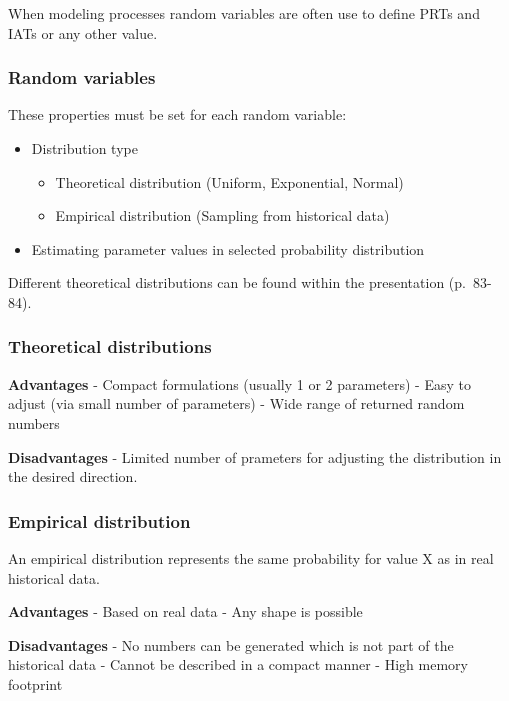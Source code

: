 When modeling processes random variables are often use to define PRTs
and IATs or any other value.

\hypertarget{random-variables}{%
\subsubsection{Random variables}\label{random-variables}}

These properties must be set for each random variable:

\begin{itemize}
\tightlist
\item
  Distribution type

  \begin{itemize}
  \tightlist
  \item
    Theoretical distribution (Uniform, Exponential, Normal)
  \item
    Empirical distribution (Sampling from historical data)
  \end{itemize}
\item
  Estimating parameter values in selected probability distribution
\end{itemize}

Different theoretical distributions can be found within the presentation
(p.~83-84).

\hypertarget{theoretical-distributions}{%
\subsubsection{Theoretical
distributions}\label{theoretical-distributions}}

\textbf{Advantages} - Compact formulations (usually 1 or 2 parameters) -
Easy to adjust (via small number of parameters) - Wide range of returned
random numbers

\textbf{Disadvantages} - Limited number of prameters for adjusting the
distribution in the desired direction.

\hypertarget{empirical-distribution}{%
\subsubsection{Empirical distribution}\label{empirical-distribution}}

An empirical distribution represents the same probability for value X as
in real historical data.

\textbf{Advantages} - Based on real data - Any shape is possible

\textbf{Disadvantages} - No numbers can be generated which is not part
of the historical data - Cannot be described in a compact manner - High
memory footprint

